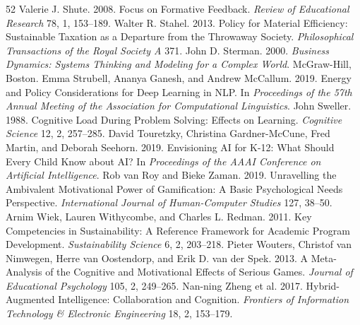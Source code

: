 \documentclass[sigconf,nonacm]{acmart}
\begin{document}
\begin{thebibliography}{52}
 Valerie J. Shute. 2008. Focus on Formative Feedback. \textit{Review of Educational Research} 78, 1, 153--189.
 Walter R. Stahel. 2013. Policy for Material Efficiency: Sustainable Taxation as a Departure from the Throwaway Society. \textit{Philosophical Transactions of the Royal Society A} 371.
 John D. Sterman. 2000. \textit{Business Dynamics: Systems Thinking and Modeling for a Complex World}. McGraw-Hill, Boston.
 Emma Strubell, Ananya Ganesh, and Andrew McCallum. 2019. Energy and Policy Considerations for Deep Learning in NLP. In \textit{Proceedings of the 57th Annual Meeting of the Association for Computational Linguistics}.
 John Sweller. 1988. Cognitive Load During Problem Solving: Effects on Learning. \textit{Cognitive Science} 12, 2, 257--285.
 David Touretzky, Christina Gardner-McCune, Fred Martin, and Deborah Seehorn. 2019. Envisioning AI for K-12: What Should Every Child Know about AI? In \textit{Proceedings of the AAAI Conference on Artificial Intelligence}.
 Rob van Roy and Bieke Zaman. 2019. Unravelling the Ambivalent Motivational Power of Gamification: A Basic Psychological Needs Perspective. \textit{International Journal of Human-Computer Studies} 127, 38--50.
 Arnim Wiek, Lauren Withycombe, and Charles L. Redman. 2011. Key Competencies in Sustainability: A Reference Framework for Academic Program Development. \textit{Sustainability Science} 6, 2, 203--218.
 Pieter Wouters, Christof van Nimwegen, Herre van Oostendorp, and Erik D. van der Spek. 2013. A Meta-Analysis of the Cognitive and Motivational Effects of Serious Games. \textit{Journal of Educational Psychology} 105, 2, 249--265.
 Nan-ning Zheng et al. 2017. Hybrid-Augmented Intelligence: Collaboration and Cognition. \textit{Frontiers of Information Technology \& Electronic Engineering} 18, 2, 153--179.
\end{thebibliography}
\end{document}
